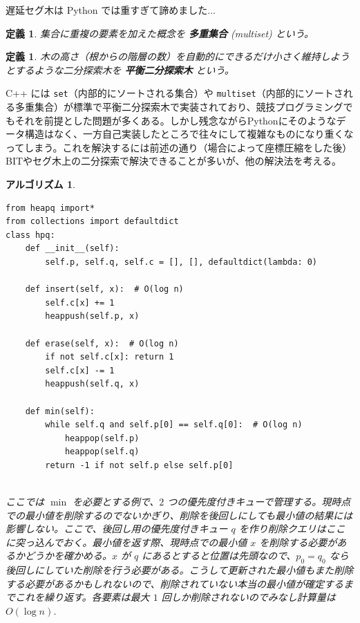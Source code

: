 \documentclass[12pt, a4j]{ltjsarticle}
\newtheorem{defi}[thm]{定義}
\newtheorem{alg}[thm]{アルゴリズム}
\newcommand*{\SS}{\vspace{1cm}}
\begin{document}
\SS

遅延セグ木は Python では重すぎて諦めました...

\SS

\begin{defi} 集合に重複の要素を加えた概念を {\bf 多重集合} (multiset) という。
\end{defi}

\SS

\begin{defi} 木の高さ（根からの階層の数）を自動的にできるだけ小さく維持しようとするような二分探索木を {\bf 平衡二分探索木} という。
\end{defi}

\SS

C++ には \lstinline{set}（内部的にソートされる集合）や \lstinline{multiset}（内部的にソートされる多重集合）が標準で平衡二分探索木で実装されており、競技プログラミングでもそれを前提とした問題が多くある。しかし残念ながらPythonにそのようなデータ構造はなく、一方自己実装したところで往々にして複雑なものになり重くなってしまう。これを解決するには前述の通り（場合によって座標圧縮をした後）BITやセグ木上の二分探索で解決できることが多いが、他の解決法を考える。

\newpage
\begin{alg}\quad\\\upshape
\begin{lstlisting}
from heapq import*
from collections import defaultdict
class hpq:
    def __init__(self):
        self.p, self.q, self.c = [], [], defaultdict(lambda: 0)

    def insert(self, x):  # O(log n)
        self.c[x] += 1
        heappush(self.p, x)

    def erase(self, x):  # O(log n)
        if not self.c[x]: return 1
        self.c[x] -= 1
        heappush(self.q, x)

    def min(self):
        while self.q and self.p[0] == self.q[0]:  # O(log n)
            heappop(self.p)
            heappop(self.q)
        return -1 if not self.p else self.p[0]
\end{lstlisting}\quad\\
ここでは $\min$ を必要とする例で、$2$ つの優先度付きキューで管理する。現時点での最小値を削除するのでないかぎり、削除を後回しにしても最小値の結果には影響しない。ここで、後回し用の優先度付きキュー $q$ を作り削除クエリはここに突っ込んでおく。最小値を返す際、現時点での最小値 $x$ を削除する必要があるかどうかを確かめる。$x$ が $q$ にあるとすると位置は先頭なので、$p_0 = q_0$ なら後回しにしていた削除を行う必要がある。こうして更新された最小値もまた削除する必要があるかもしれないので、削除されていない本当の最小値が確定するまでこれを繰り返す。各要素は最大 $1$ 回しか削除されないのでみなし計算量は $O(\log n)$.
\end{alg}
\end{document}
